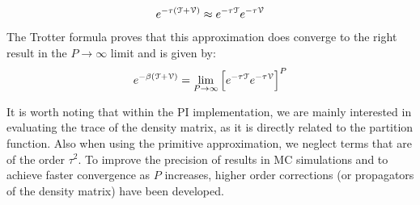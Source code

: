         \begin{equation} \label{primitiveApprox}
            e^{- \tau (\text{$\mathcal{T}$} + \text{$\mathcal{V}$})} \approx e^{- \tau \text{$\mathcal{T}$}} e^{- \tau \text{$\mathcal{V}$}}
        \end{equation}
        The Trotter formula proves that this approximation does converge to the right result in the $P \to \infty$ limit and is given by:
        \begin{equation} \label{trotter}
            e^{- \beta (\text{$\mathcal{T}$} + \text{$\mathcal{V}$})} = \lim_{P \to \infty} \Big[ e^{- \tau \text{$\mathcal{T}$}} e^{- \tau \text{$\mathcal{V}$}} \Big]^P
        \end{equation}

        It is worth noting that within the PI implementation, we are mainly interested in evaluating the trace of the density matrix, as it is directly related to the partition function. Also when using the primitive approximation, we neglect terms that are of the order $\tau^2$. To improve the precision of results in MC simulations and to achieve faster convergence as $P$ increases, higher order corrections (or propagators of the density matrix) have been developed.

